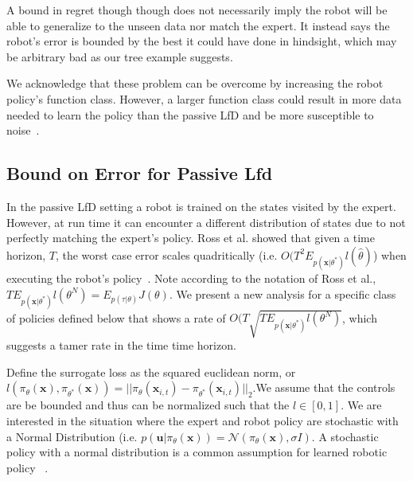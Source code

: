 \documentclass[10pt, conference]{ieeeconf}      %
\newcommand{\bu}{\mathbf{u}}
\newcommand{\bx}{\mathbf{x}}
\begin{document}
A bound in regret though though does not necessarily imply the robot will be able to generalize to the unseen data nor match the expert. It instead says the robot's error is bounded by the best it could have done in hindsight, which may be arbitrary bad as our tree example suggests. 

We acknowledge that these  problem can be overcome by increasing the robot policy's function class. However, a larger function class could result in more data needed to learn the policy than the passive LfD and be more susceptible to noise~\cite{kakade2009generalization}.

\subsection{Bound on Error for Passive Lfd}
In the passive LfD setting a robot is trained on the states visited by the expert. However, at run time it can encounter a different distribution of states due to not perfectly matching the expert's policy. Ross et al. showed that given a time horizon, $T$, the worst case error scales quadritically (i.e. $O(T^2E_{p(\bx|\theta^*)} l(\hat{\theta})$) when executing the robot's policy~\cite{ross2010efficient}. Note according to the notation of Ross et al., $TE_{p(\bx|\theta^*)} l(\theta^N) = E_{p(\tau|\theta)} J(\theta)$. We present a new analysis for a specific class of policies defined below that shows a rate of $O(T\sqrt{TE_{p(\bx|\theta^*)} l(\theta^N)}$, which suggests a tamer rate in the time time horizon. 

 Define the surrogate loss as the squared euclidean norm, or $l(\pi_{\theta}(\bx),\pi_{\theta^*}(\bx)) = ||\pi_{\theta}(\bx_{i,t}) - \pi_{\theta^*}(\bx_{i,t})||_2$.We assume that the controls are be bounded and thus can be normalized such that the $l \in [0,1]$.  We are interested in the situation where the expert and robot policy are stochastic with a Normal Distribution (i.e. $p(\bu|\pi_{\theta}(\bx)) = \mathcal{N}(\pi_\theta(\bx),\sigma I)$. A stochastic policy with a normal distribution is a common assumption for learned robotic policy ~\cite{levine2015end}. 
 
\end{document}
